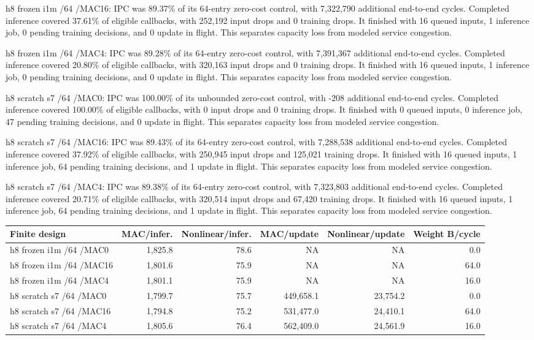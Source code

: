 \documentclass[10pt]{article}
\begin{document}
h8 frozen i1m /64 /MAC16: IPC was 89.37\% of its 64-entry zero-cost control, with 7,322,790 additional end-to-end cycles. Completed inference covered 37.61\% of eligible callbacks, with 252,192 input drops and 0 training drops. It finished with 16 queued inputs, 1 inference job, 0 pending training decisions, and 0 update in flight. This separates capacity loss from modeled service congestion.

h8 frozen i1m /64 /MAC4: IPC was 89.28\% of its 64-entry zero-cost control, with 7,391,367 additional end-to-end cycles. Completed inference covered 20.80\% of eligible callbacks, with 320,163 input drops and 0 training drops. It finished with 16 queued inputs, 1 inference job, 0 pending training decisions, and 0 update in flight. This separates capacity loss from modeled service congestion.

h8 scratch s7 /64 /MAC0: IPC was 100.00\% of its unbounded zero-cost control, with -208 additional end-to-end cycles. Completed inference covered 100.00\% of eligible callbacks, with 0 input drops and 0 training drops. It finished with 0 queued inputs, 0 inference job, 47 pending training decisions, and 0 update in flight. This separates capacity loss from modeled service congestion.

h8 scratch s7 /64 /MAC16: IPC was 89.43\% of its 64-entry zero-cost control, with 7,288,538 additional end-to-end cycles. Completed inference covered 37.92\% of eligible callbacks, with 250,945 input drops and 125,021 training drops. It finished with 16 queued inputs, 1 inference job, 64 pending training decisions, and 1 update in flight. This separates capacity loss from modeled service congestion.

h8 scratch s7 /64 /MAC4: IPC was 89.38\% of its 64-entry zero-cost control, with 7,323,803 additional end-to-end cycles. Completed inference covered 20.71\% of eligible callbacks, with 320,514 input drops and 67,420 training drops. It finished with 16 queued inputs, 1 inference job, 64 pending training decisions, and 1 update in flight. This separates capacity loss from modeled service congestion.

\begin{center}
\scriptsize
\begin{longtable}{lrrrrr}
\toprule
Finite design & MAC/infer. & Nonlinear/infer. & MAC/update & Nonlinear/update & Weight B/cycle \\
\midrule
\endhead
h8 frozen i1m /64 /MAC0 & 1,825.8 & 78.6 & NA & NA & 0.0 \\
h8 frozen i1m /64 /MAC16 & 1,801.6 & 75.9 & NA & NA & 64.0 \\
h8 frozen i1m /64 /MAC4 & 1,801.1 & 75.9 & NA & NA & 16.0 \\
h8 scratch s7 /64 /MAC0 & 1,799.7 & 75.7 & 449,658.1 & 23,754.2 & 0.0 \\
h8 scratch s7 /64 /MAC16 & 1,794.8 & 75.2 & 531,477.0 & 24,410.1 & 64.0 \\
h8 scratch s7 /64 /MAC4 & 1,805.6 & 76.4 & 562,409.0 & 24,561.9 & 16.0 \\
\bottomrule
\end{longtable}
\end{center}
\end{document}
